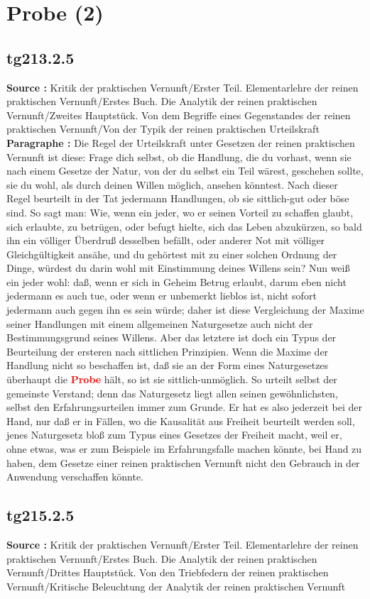 \documentclass[a4paper,12pt,twoside]{book}
\newcommand{\match}[1]{\textcolor{red}{\textbf{#1}}}
\newcommand{\unnumberedsection}[1]{
	\section*{#1}
	\addcontentsline{toc}{section}{#1}
	\markright{#1}
}
\begin{document}
	\unnumberedsection{Probe (2)} 
	\subsection*{tg213.2.5} 
	\textbf{Source : }Kritik der praktischen Vernunft/Erster Teil. Elementarlehre der reinen praktischen Vernunft/Erstes Buch. Die Analytik der reinen praktischen Vernunft/Zweites Hauptstück. Von dem Begriffe eines Gegenstandes der reinen praktischen Vernunft/Von der Typik der reinen praktischen Urteilskraft\\  
	
	\textbf{Paragraphe : }Die Regel der Urteilskraft unter Gesetzen der reinen praktischen Vernunft ist diese: Frage dich selbst, ob die Handlung, die du vorhast, wenn sie nach einem Gesetze der Natur, von der du selbst ein Teil wärest, geschehen sollte, sie du wohl, als durch deinen Willen möglich, ansehen könntest. Nach dieser Regel beurteilt in der Tat jedermann Handlungen, ob sie sittlich-gut oder böse sind. So sagt man: Wie, wenn ein jeder, wo er seinen Vorteil zu schaffen glaubt, sich erlaubte, zu betrügen, oder befugt hielte, sich das Leben abzukürzen, so bald ihn ein völliger Überdruß desselben befällt, oder anderer Not mit völliger Gleichgültigkeit ansähe,  und du gehörtest mit zu einer solchen Ordnung der Dinge, würdest du darin wohl mit Einstimmung deines Willens sein? Nun weiß ein jeder wohl: daß, wenn er sich in Geheim Betrug erlaubt, darum eben nicht jedermann es auch tue, oder wenn er unbemerkt lieblos ist, nicht sofort jedermann auch gegen ihn es sein würde; daher ist diese Vergleichung der Maxime seiner Handlungen mit einem allgemeinen Naturgesetze auch nicht der Bestimmungsgrund seines Willens. Aber das letztere ist doch ein Typus der Beurteilung der ersteren nach sittlichen Prinzipien. Wenn die Maxime der Handlung nicht so beschaffen ist, daß sie an der Form eines Naturgesetzes überhaupt die \match{Probe} hält, so ist sie sittlich-unmöglich. So urteilt selbst der gemeinste Verstand; denn das Naturgesetz liegt allen seinen gewöhnlichsten, selbst den Erfahrungsurteilen immer zum Grunde. Er hat es also jederzeit bei der Hand, nur daß er in Fällen, wo die Kausalität aus Freiheit beurteilt werden soll, jenes Naturgesetz bloß zum Typus eines Gesetzes der Freiheit macht, weil er, ohne etwas, was er zum Beispiele im Erfahrungsfalle machen könnte, bei Hand zu haben, dem Gesetze einer reinen praktischen Vernunft nicht den Gebrauch in der Anwendung verschaffen könnte. 
	
	\subsection*{tg215.2.5} 
	\textbf{Source : }Kritik der praktischen Vernunft/Erster Teil. Elementarlehre der reinen praktischen Vernunft/Erstes Buch. Die Analytik der reinen praktischen Vernunft/Drittes Hauptstück. Von den Triebfedern der reinen praktischen Vernunft/Kritische Beleuchtung der Analytik der reinen praktischen Vernunft\\  
	
\end{document}
